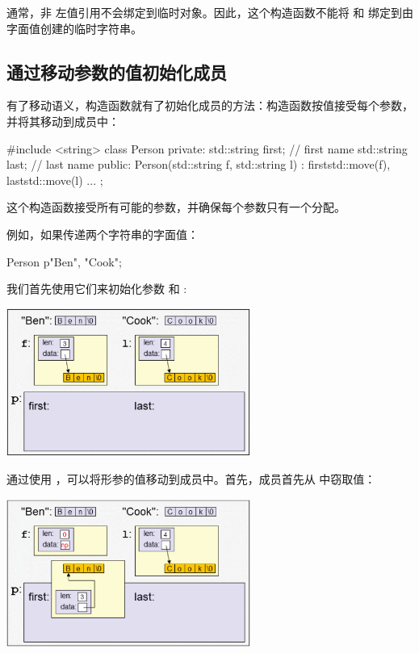 通常，非  左值引用不会绑定到临时对象。因此，这个构造函数不能将  和  绑定到由字面值创建的临时字符串。

\subsection{通过移动参数的值初始化成员}

有了移动语义，构造函数就有了初始化成员的方法：构造函数按值接受每个参数，并将其移动到成员中：

\begin{cppcode}
#include <string>
class Person {
private:
	std::string first; // first name
	std::string last; // last name
public:
	Person(std::string f, std::string l)
	: first{std::move(f)}, last{std::move(l)} {
	}
	...
};
\end{cppcode}

这个构造函数接受所有可能的参数，并确保每个参数只有一个分配。

例如，如果传递两个字符串的字面值：

\begin{cppcode}
Person p{"Ben", "Cook"};
\end{cppcode}

我们首先使用它们来初始化参数  和 :

\begin{center}
	\includegraphics[width=0.6\textwidth]{part1/ch4/images/4}
\end{center}

通过使用 ，可以将形参的值移动到成员中。首先，成员首先从  中窃取值：

\begin{center}
	\includegraphics[width=0.6\textwidth]{part1/ch4/images/5}
\end{center}

